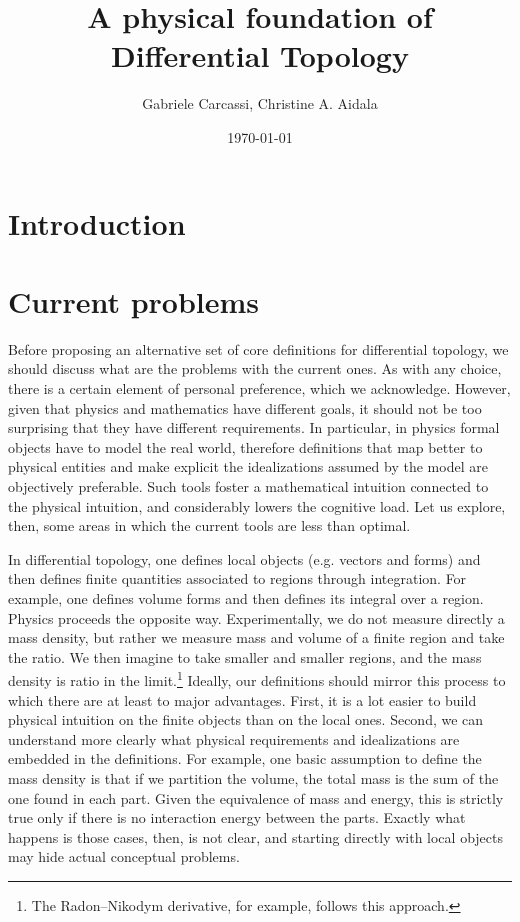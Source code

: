 \documentclass[10pt,twocolumn, nofootinbib]{revtex4-2}
\begin{document}
\title{A physical foundation of Differential Topology}
\author{Gabriele Carcassi, Christine A. Aidala}

\date{\today}


\begin{abstract}

\end{abstract}

\maketitle

\section{Introduction}

\section{Current problems}

Before proposing an alternative set of core definitions for differential topology, we should discuss what are the problems with the current ones. As with any choice, there is a certain element of personal preference, which we acknowledge. However, given that physics and mathematics have different goals, it should not be too surprising that they have different requirements. In particular, in physics formal objects have to model the real world, therefore definitions that map better to physical entities and make explicit the idealizations assumed by the model are objectively preferable. Such tools foster a mathematical intuition connected to the physical intuition, and considerably lowers the cognitive load. Let us explore, then, some areas in which the current tools are less than optimal.

In differential topology, one defines local objects (e.g. vectors and forms) and then defines finite quantities associated to regions through integration. For example, one defines volume forms and then defines its integral over a region. Physics proceeds the opposite way. Experimentally, we do not measure directly a mass density, but rather we measure mass and volume of a finite region and take the ratio. We then imagine to take smaller and smaller regions, and the mass density is ratio in the limit.\footnote{The Radon–Nikodym derivative, for example, follows this approach.} Ideally, our definitions should mirror this process to which there are at least to major advantages. First, it is a lot easier to build physical intuition on the finite objects than on the local ones. Second, we can understand more clearly what physical requirements and idealizations are embedded in the definitions. For example, one basic assumption to define the mass density is that if we partition the volume, the total mass is the sum of the one found in each part. Given the equivalence of mass and energy, this is strictly true only if there is no interaction energy between the parts. Exactly what happens is those cases, then, is not clear, and starting directly with local objects may hide actual conceptual problems.
\end{document}
